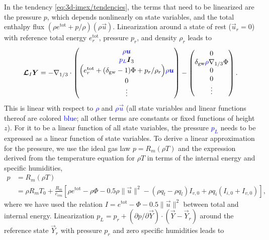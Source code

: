 \documentclass{report}
\begin{document}
In the tendency \eqref{eq:3d-imex/tendencies}, the terms that need to be linearized are the pressure $p$, which depends nonlinearly on state variables, and the total enthalpy flux $(\rho e^{\mathrm{tot}} + p/\rho) (\rho \vec{u})$. Linearization around a state of rest ($\vec{u}_r=0$) with reference total energy $e^{\mathrm{tot}}_r$, pressure $p_r$, and density $\rho_r$ leads to
 \begin{equation}\label{e:IMEX_linear}
 \vec{\mathcal{L}}_I \vec{Y} = 
 -\nabla_{1/3} \cdot \begin{pmatrix}
 \textcolor{blue}{\rho \vec{u}} \\
 \textcolor{blue}{p_L} \vec{I}_3  \\
 \Bigl(e^{\mathrm{tot}}_r  + (\delta_{\mathrm{gw}}-1)\Phi + p_r/\rho_r \Bigr) \textcolor{blue}{\rho \vec{u}}\\
 0\\
\vdots
\end{pmatrix}
-
\begin{pmatrix}
0 \\
\delta_{\mathrm{gw}} \textcolor{blue} \rho \nabla_{1/3} \Phi \\
0\\
0\\
\vdots
\end{pmatrix}.
\end{equation}
This is linear with respect to \textcolor{blue}{$\rho$} and \textcolor{blue}{$\rho \vec{u}$} (all state variables and linear functions thereof are colored \textcolor{blue}{blue}; all other terms are constants or fixed functions of height $z$). For it to be a linear function of all state variables, the pressure \textcolor{blue}{$p_L$} needs to be expressed as a linear function of state variables. To derive a linear approximation for the pressure, we use the ideal gas law $p = R_m (\rho T)$ and the expression derived from the temperature equation 
for $\rho T$ in terms of the internal energy and specific humidities,
\begin{equation}\label{e:pressure}
\begin{split}
p &= R_m (\rho T) \\
  &= \rho R_m T_0 + \frac{R_m}{c_{vm}} \left[\rho e^{\mathrm{tot}} - \rho \Phi - 0.5 \rho \|\vec{u}\|^2 - (\rho q_t - \rho q_l) I_{v,0} + \rho q_i (I_{i,0} + I_{v,0}) \right],
\end{split}
\end{equation}
where we have used the relation $I = e^{\mathrm{tot}} - \Phi - 0.5 \|\vec{u}\|^2$ between total and internal energy. Linearization $p_L = p_r + (\partial p/\partial\vec{Y})\cdot(\vec{Y}-\vec{Y}_r)$ around the reference state $\vec{Y}_r$ with pressure $p_r$ and zero specific humidities leads to 
\end{document}
